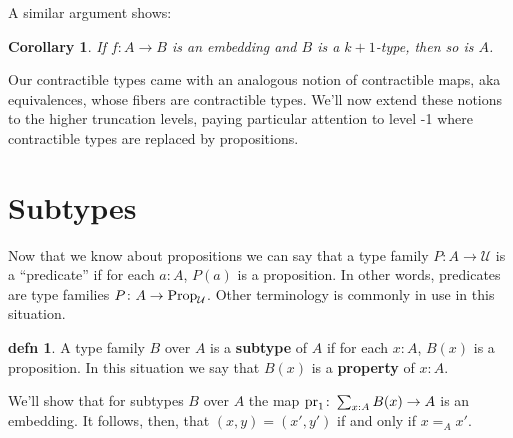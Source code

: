 \documentclass{amsart}
\theoremstyle{theorem}
\newtheorem*{cor}{Corollary}
\theoremstyle{definition}
\newtheorem*{defn}{defn}
\theoremstyle{remark}
\newcommand{\0}{\mathbbe{0}}
\newcommand{\1}{\mathbbe{1}}
\newcommand{\2}{\mathbbe{2}}
\newcommand{\3}{\mathbbe{3}}
\newcommand{\4}{\mathbbe{4}}
\newcommand{\term}[1]{{\textup{#1}}}
\newcommand{\type}[1]{{\textup{#1}}}
\newcommand{\pr}{\term{pr}}
\newcommand{\UU}{{\mathcal{U}}}
\newcommand{\Prop}{\type{Prop}_{\UU}}
\begin{document}
A similar argument shows:

\begin{cor} If $f \colon A \to B$ is an embedding and $B$ is a $k+1$-type, then so is $A$.
\end{cor}

Our contractible types came with an analogous notion of contractible maps, aka equivalences, whose fibers are contractible types. We'll now extend these notions to the higher truncation levels, paying particular attention to level -1 where contractible types are replaced by propositions.


\section*{Subtypes}

Now that we know about propositions we can say that a type family $P \colon A \to \UU$ is a ``predicate'' if for each $a :A$, $P(a)$ is a proposition. In other words, predicates are type families $P \colon A \to \Prop$. Other terminology is commonly in use in this situation.

\begin{defn} A type family $B$ over $A$ is a \textbf{subtype} of $A$ if for each $x:A$, $B(x)$ is a proposition. In this situation we say that $B(x)$ is a \textbf{property} of $x:A$.
\end{defn}

We'll show that for subtypes $B$ over $A$ the map $\pr_1 \colon \sum_{x:A} B(x) \to A$ is an embedding. It follows, then, that $(x,y) = (x',y')$ if and only if $x=_Ax'$.
\end{document}
